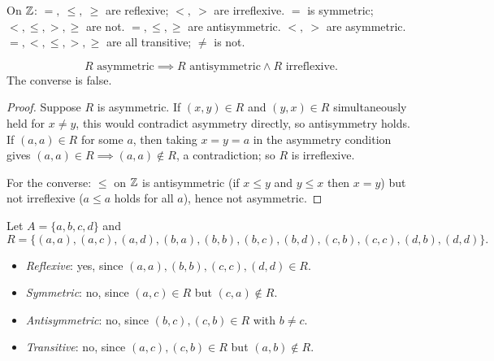 \documentclass[11pt]{article}
\begin{document}
\begin{example}
On $\mathbb{Z}$: $=,\ \le,\ \ge$ are reflexive; $<,\ >$ are irreflexive. $=$ is symmetric; $<,\le,>,\ge$ are not. $=,\le,\ge$ are antisymmetric. $<,\ >$ are asymmetric. $=,<,\le,>,\ge$ are all transitive; $\neq$ is not.
\end{example}

\begin{theorem}
\[
R \text{ asymmetric} \implies R \text{ antisymmetric} \wedge R \text{ irreflexive}.
\]
The converse is false.
\end{theorem}
\begin{proof}
Suppose $R$ is asymmetric. If $(x,y) \in R$ and $(y,x) \in R$ simultaneously held for $x \neq y$, this would contradict asymmetry directly, so antisymmetry holds. If $(a,a) \in R$ for some $a$, then taking $x=y=a$ in the asymmetry condition gives $(a,a) \in R \implies (a,a) \notin R$, a contradiction; so $R$ is irreflexive.

For the converse: $\le$ on $\mathbb{Z}$ is antisymmetric (if $x\le y$ and $y\le x$ then $x=y$) but not irreflexive ($a \le a$ holds for all $a$), hence not asymmetric.
\end{proof}

\begin{example}
Let $A = \{a,b,c,d\}$ and
\[
R = \{(a,a),(a,c),(a,d),(b,a),(b,b),(b,c),(b,d),(c,b),(c,c),(d,b),(d,d)\}.
\]
\begin{itemize}
    \item \emph{Reflexive}: yes, since $(a,a),(b,b),(c,c),(d,d) \in R$.
    \item \emph{Symmetric}: no, since $(a,c) \in R$ but $(c,a) \notin R$.
    \item \emph{Antisymmetric}: no, since $(b,c),(c,b) \in R$ with $b \neq c$.
    \item \emph{Transitive}: no, since $(a,c),(c,b) \in R$ but $(a,b) \notin R$.
\end{itemize}
\end{example}
\end{document}
